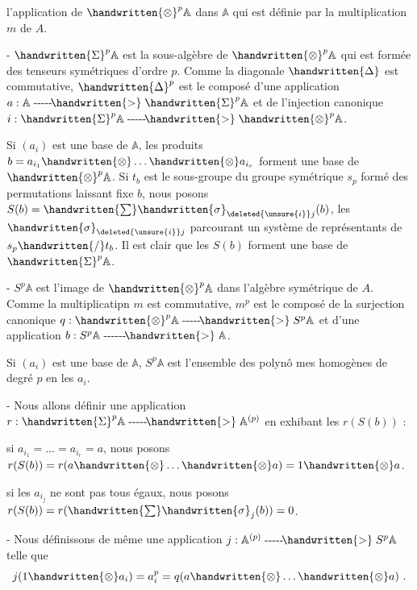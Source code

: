 l'application de $\handwritten{\otimes}^{p}\mathbb{A}$ dans $\mathbb{A}$ qui est définie par la multiplication $m$ de $A$.

\noindent - $\handwritten{\Sigma}^{p}\mathbb{A}$ est la sous-algèbre de $\handwritten{\otimes}^{p}\mathbb{A}$ qui est formée des tenseurs symétriques d'ordre $p$. Comme la diagonale $\handwritten{\Delta}$ est commutative, $\handwritten{\Delta}^{p}$ est le composé d'une application $a:\mathbb{A}\mathrel{\text{-{}-{}-{}-{}-}\!\handwritten{>}}\handwritten{\Sigma}^{p}\mathbb{A}$ et de l'injection canonique $i:\handwritten{\Sigma}^{p}\mathbb{A}\mathrel{\text{-{}-{}-{}-{}-}\!\handwritten{>}}\handwritten{\otimes}^{p}\mathbb{A}$.

Si $(a_i)$ est une base de $\mathbb{A}$, les produits $b=a_{i_1}\handwritten{\otimes}\ldots\handwritten{\otimes}a_{i_r}$ forment une base de $\handwritten{\otimes}^{p}\mathbb{A}$. Si $t_b$ est le sous-groupe du groupe symétrique $s_p$ formé des permutations laissant fixe $b$, nous posons $S(b)=\handwritten{\sum}\handwritten{\sigma}_{\deleted{\unsure{i}}j}(b)$, les $\handwritten{\sigma}_{\deleted{\unsure{i}}j}$ parcourant un système de représentants de $s_p\handwritten{/}t_b$. Il est clair que les $S(b)$ forment une base de $\handwritten{\Sigma}^{p}\mathbb{A}$.

\noindent - $S^{p}\mathbb{A}$ est l'image de $\handwritten{\otimes}^{p}\mathbb{A}$ dans l'algèbre symétrique de $A$. Comme la multiplicatipn $m$ est commutative, $m^p$ est le composé de la surjection canonique $q:\handwritten{\otimes}^{p}\mathbb{A}\mathrel{\text{-{}-{}-{}-{}-}\!\handwritten{>}}S^p\mathbb{A}$ et d'une application $b:S^p\mathbb{A}\mathrel{\text{-{}-{}-{}-{}-{}-}\!\handwritten{>}}\mathbb{A}$.

Si $(a_i)$ est une base de $\mathbb{A}$, $S^p\mathbb{A}$ est l'ensemble des polynô mes homogènes de degré $p$ en les $a_i$.

\noindent - Nous allons définir une application $r:\handwritten{\Sigma}^{p}\mathbb{A}\mathrel{\text{-{}-{}-{}-{}-}\!\handwritten{>}}\mathbb{A}^{(p)}$ en exhibant les $r(S(b))$ :

si $a_{i_1}=\ldots=a_{i_r}=a$, nous posons $r(S(b))=r(a\handwritten{\otimes}\ldots\handwritten{\otimes}a)=1\handwritten{\otimes}a$.

si les $a_{i_j}$ ne sont pas tous égaux, nous posons $r(S(b))=r(\handwritten{\sum}\handwritten{\sigma}_j(b))=0$.

\noindent - Nous définissons de même une application $j:\mathbb{A}^{(p)}\mathrel{\text{-{}-{}-{}-{}-}\!\handwritten{>}}S^p\mathbb{A}$ telle que
\[
j(1\handwritten{\otimes}a_i)=a_i^p=q(a\handwritten{\otimes}\ldots\handwritten{\otimes}a)\ .
\]
